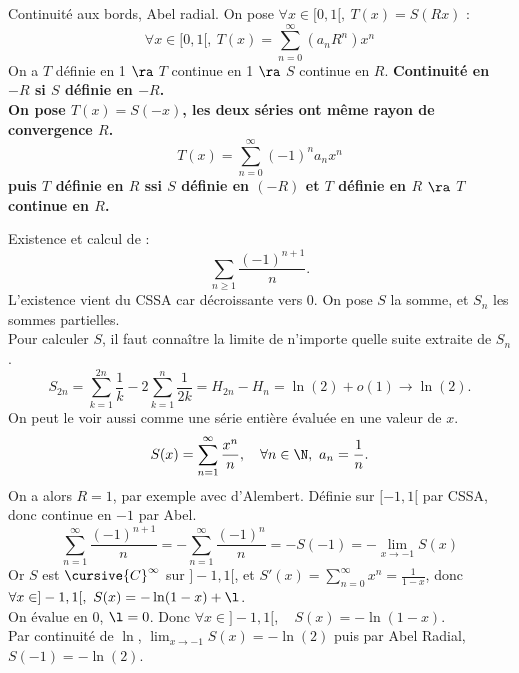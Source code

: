 \documentclass[11pt]{article}
\begin{document}
\begin{thm}{Continuité aux bords, Abel radial.}{}
    On pose $\forall x \in [0,1[, ~ T(x)=S\left(Rx\right)$ :
    \begin{equation*}
        \forall x \in [0,1[, ~ T(x) = \sum_{n=0}^\infty(a_nR^n)x^n
    \end{equation*} 
    On a $T$ définie en 1 $\ra$ $T$ continue en 1 $\ra$ $S$ continue en $R$.\n
    \bf{Continuité en $-R$ si $S$ définie en $-R$.}\\
    On pose $T(x)=S(-x)$, les deux séries ont même rayon de convergence $R$.
    \begin{equation*}
        T(x)=\sum_{n=0}^\infty(-1)^na_nx^n
    \end{equation*}
    puis $T$ définie en $R$ ssi $S$ définie en $(-R)$ et $T$ définie en $R$ $\ra$ $T$ continue en $R$.
\end{thm}

\begin{ex}{}{}
    Existence et calcul de :
    \begin{equation*}
        \sum_{n\geq1}\frac{(-1)^{n+1}}{n}.
    \end{equation*}
    \tcblower
    L'existence vient du CSSA car décroissante vers 0. On pose $S$ la somme, et $S_n$ les sommes partielles.\\
    Pour calculer $S$, il faut connaître la limite de n'importe quelle suite extraite de $S_n$.
    \begin{equation*}
        S_{2n} = \sum_{k=1}^{2n}\frac{1}{k} - 2\sum_{k=1}^n\frac{1}{2k} = H_{2n} - H_n = \ln(2) + o(1) \to \ln(2).
    \end{equation*}
    On peut le voir aussi comme une série entière évaluée en une valeur de $x$.
    \begin{equation*}
        S(x) = \sum_{n=1}^{\infty}\frac{x^n}{n}, \quad \forall n \in \N, ~ a_n = \frac{1}{n}.
    \end{equation*}
    On a alors $R=1$, par exemple avec d'Alembert. Définie sur $[-1,1[$ par CSSA, donc continue en $-1$ par Abel.
    \begin{equation*}
        \sum_{n=1}^\infty\frac{(-1)^{n+1}}{n} = -\sum_{n=1}^\infty\frac{(-1)^n}{n} = -S(-1) = - \lim_{x\to-1}S(x)
    \end{equation*}
    Or $S$ est $\cursive{C}^\infty$ sur $]-1,1[$, et $S'(x)=\sum_{n=0}^\infty x^n = \frac{1}{1-x}$, donc $\forall x \in ]-1,1[, ~  S(x)=-\ln(1-x)+\l$.\\
    On évalue en $0$, $\l=0$. Donc $\forall x \in ]-1,1[$, ~ $S(x)=-\ln(1-x)$.\\
    Par continuité de $\ln$, $\lim_{x\to-1}S(x)=-\ln(2)$ puis par Abel Radial, $S(-1)=-\ln(2)$.
\end{ex}
\end{document}
